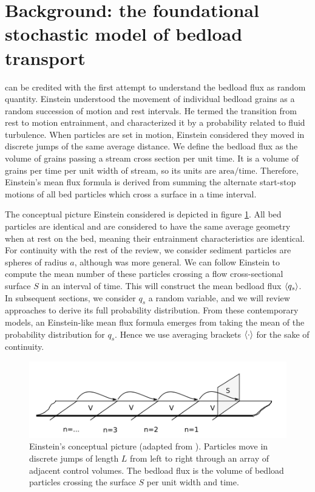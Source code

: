 \section{Background: the foundational stochastic model of bedload transport} 
\label{sec:background}
 
\citet{Einstein1950} can be credited with the first attempt to understand the bedload flux as random quantity.  
Einstein understood the movement of individual bedload grains as a random succession of motion and rest intervals.
He termed the transition from rest to motion entrainment, and characterized it by a probability related to fluid turbulence. 
When particles are set in motion, Einstein considered they moved in discrete jumps of the same average distance. 
We define the bedload flux as the volume of grains passing a stream cross section per unit time.
It is a volume of grains per time per unit width of stream, so its units are $\text{area}/\text{time}$.  
Therefore, Einstein's mean flux formula is derived from summing the alternate start-stop motions of all bed particles which cross a surface in a time interval. 

The conceptual picture Einstein considered is depicted in figure \ref{fig:yalin}. 
All bed particles are identical and are considered to have the same average geometry when at rest on the bed, meaning their entrainment characteristics are identical. 
For continuity with the rest of the review, we consider sediment particles are spheres of radius $a$, although \citet{Einstein1950} was more general. 
We can follow Einstein to compute the mean number of these particles crossing a flow cross-sectional surface $S$ in an interval of time. 
This will construct the mean bedload flux $\langle q_s \rangle$.
In subsequent sections, we consider $q_s$ a random variable, and we will review approaches to derive its full probability distribution.
From these contemporary models, an Einstein-like mean flux formula emerges from taking the mean of the probability distribution for $q_s$.  
Hence we use averaging brackets $\langle \cdot \rangle$ for the sake of continuity. 
 
\begin{figure}
  \centering
  \includegraphics[width=.98\linewidth]{./figures/yalindrawing.png}
  \caption{Einstein's conceptual picture (adapted from \citet{Yalin1972}). Particles move in discrete jumps of length $L$ from left to right through an array of adjacent control volumes. The bedload flux is the volume of bedload particles crossing the surface $S$ per unit width and time. \label{fig:yalin}}
\end{figure}

